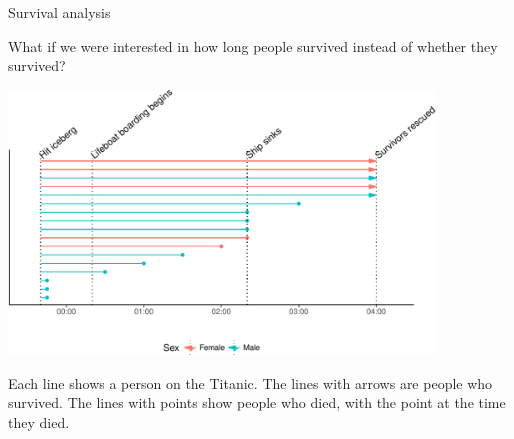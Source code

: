 \documentclass[ignorenonframetext,]{beamer}
\begin{document}
\begin{frame}{Survival analysis}

What if we were interested in how long people survived instead of
whether they survived?

\vspace*{-5mm}

\begin{center}\includegraphics[width=0.85\textwidth]{regression_files/figure-beamer/unnamed-chunk-15-1} \end{center}

\vspace*{-5mm}

\footnotesize
Each line shows a person on the Titanic. The lines with arrows are
people who survived. The lines with points show people who died, with
the point at the time they died.

\end{frame}
\end{document}
